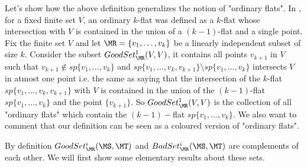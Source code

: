 \begin{remark}\label{remark:ordinary}
 Let's show how the above definition generalizes the notion of "ordinary flats". In \cite{BDWY11}, for a fixed finite set $V$,
 an ordinary $k$-flat was defined as a $k$-flat whose intersection with $V$ is contained in the union of a $(k-1)$-flat and
 a single point. Fix the finite set $V$ and let $\MR = \{v_1,\ldots,v_k\}$ be a linearly independent subset of size $k$. 
 Consider the subset $GoodSet^1_{\MR}(V,V)$, it contains all points $v_{k+1}$ in $V$ such that $v_{k+1}\notin sp\{v_1,\ldots,v_k\}$
 and $sp\{v_1,\ldots,v_k,v_{k+1}\}\setminus sp\{v_1,\ldots, v_k\}$ intersects $V$ in atmost one point i.e. the same as saying
 that the intersection of the $k$-flat $sp\{v_1,\ldots,v_k,v_{k+1}\}$ with $V$ is contained in the union of the $(k-1)$-flat
 $sp\{v_1,\ldots,v_k\}$ and the point $\{v_{k+1}\}$. So $GoodSet^1_\MR(V,V)$ is the collection of all "ordinary flats" which contain the
 $(k-1)-$flat $sp\{v_1,\ldots,v_k\}$. We also want to comment that our definition can be seen as a coloured version of "ordinary flats".
\end{remark}



By definition $GoodSet^i_\MR(\MS,\MT)$ and $BadSet^i_{\MR}(\MS,\MT)$ are complements of each other. We will first show some elementary results 
about these sets.

